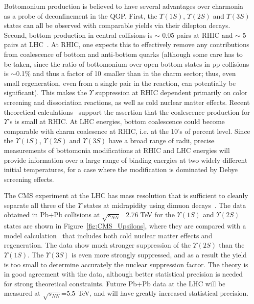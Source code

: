 Bottomonium production is believed to have several advantages over charmonia as a probe of deconfinement in the
QGP. First, the $\Upsilon(1S)$, $\Upsilon(2S)$ and $\Upsilon(3S)$ states can all be observed with comparable
yields via their dilepton decays. Second, bottom production in central collisions is $\sim$ 0.05 pairs at RHIC
and $\sim$ 5 pairs at LHC~\cite{Brambilla:2010cs}. At RHIC, one expects this to effectively remove any contributions
from coalescence of bottom and anti-bottom quarks (although some care has to be taken, since the ratio of bottomonium over
open bottom states in pp collisions is $\sim$0.1\% and thus a factor of 10 smaller than in the charm
sector; thus, even small regeneration, even from a single pair in the reaction, can potentially be significant).
This makes the $\Upsilon$ suppression at RHIC dependent primarily on color screening and dissociation reactions,
as well as cold nuclear matter effects. Recent theoretical calculations~\cite{Emerick:2011xu} support the
assertion that the coalescence production for $\Upsilon$'s is small at RHIC. At LHC energies, 
bottom coalescence could become comparable with charm coalesence at RHIC, i.e. at the 10's of percent level.
Since the $\Upsilon(1S)$, $\Upsilon(2S)$ and $\Upsilon(3S)$ have a broad range of radii, precise measurements
of bottomonia modifications at RHIC and LHC energies will provide information over a large range of
binding energies at two widely different initial temperatures, for a case where the modification is dominated
by Debye screening effects.
	
The CMS experiment at the LHC has mass resolution that is sufficient to cleanly separate all three of the
$\Upsilon$ states at midrapidity using dimuon decays~\cite{Chatrchyan:2012lxa}. The data obtained in Pb+Pb collisions at
$\sqrt{s_{NN}}$=2.76 TeV for the $\Upsilon(1S)$ and $\Upsilon(2S)$ states are shown in
Figure~\ref{fig:CMS_Upsilons}, where they are compared with a model calculation~\cite{Emerick:2011xu} that includes
both cold nuclear matter effects and regeneration. The data show much stronger suppression of the $\Upsilon(2S)$
than the $\Upsilon(1S)$. The $\Upsilon(3S)$ is even more strongly suppressed, 
and as a result the yield is too small to determine accurately the nuclear suppression factor. 
The theory is in good agreement with the data, although better statistical precision is needed for strong
theoretical constraints. Future Pb+Pb data at the LHC will be measured at $\sqrt{s_{NN}}$=5.5 TeV, and will have greatly increased
statistical precision.
	
